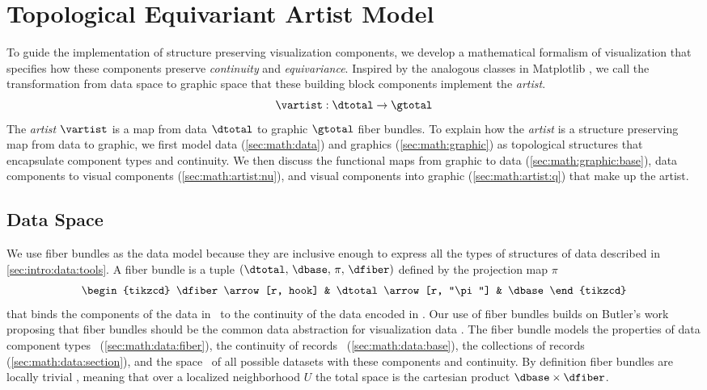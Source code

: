 \documentclass[../main.tex]{subfiles}
\begin{document}
\section{Topological Equivariant Artist Model}
\label{sec:math}
To guide the implementation of structure preserving visualization components, we develop a mathematical formalism of visualization that specifies how these components preserve \textit{continuity} and \textit{equivariance}. Inspired by the analogous classes in Matplotlib \cite{hunterArchitectureOpenSource}, we call the transformation from data space to graphic space that these building block components implement the \textit{artist}.
\begin{equation}
    \label{eq:artist}
    \mathscr{\vartist}: \mathscr{\dtotal} \rightarrow \mathscr{\gtotal}
\end{equation}
The \textit{artist} \(\mathscr{\vartist}\) is a map from data \(\mathscr{\dtotal}\) to graphic \(\mathscr{\gtotal}\) fiber bundles. To explain how the \textit{artist} is a structure preserving map from data to graphic, we first model data (\autoref{sec:math:data}) and graphics (\autoref{sec:math:graphic}) as topological structures that encapsulate component types and continuity. We then discuss the functional maps from graphic to data (\autoref{sec:math:graphic:base}), data components to visual components (\autoref{sec:math:artist:nu}), and visual components into graphic (\autoref{sec:math:artist:q}) that make up the artist.

\subsection{Data Space \dtotal}
\label{sec:math:data}
We use fiber bundles as the data model because they are inclusive enough to express all the types of structures of data described in \autoref{sec:intro:data:tools}. A fiber bundle is a tuple \((\dtotal,\,\dbase,\,\pi ,\,\dfiber)\) defined by the projection map \(\pi\)
\begin{equation}
    \label{eq:fiber_bundle}
    \begin{tikzcd}
        \dfiber \arrow[r, hook] & \dtotal \arrow[r, "\pi"] & \dbase
    \end{tikzcd}
\end{equation}
that binds the components of the data in \dfiber\ to the continuity of the data encoded in \dbase. Our use of fiber bundles builds on Butler's work proposing that fiber bundles should be the common data abstraction for visualization data \cite{butlerVectorBundleClassesForm1992, butlerVisualizationModelBased1989}. The fiber bundle models the properties of data component types \dfiber\ (\autoref{sec:math:data:fiber}), the continuity of records \dbase\ (\autoref{sec:math:data:base}), the collections of records (\autoref{sec:math:data:section}), and the space \dtotal\ of all possible datasets with these components and continuity. By definition fiber bundles are locally trivial \cite{spanier1989algebraic,LocallyTrivialFibre}, meaning that over a localized neighborhood \(U\) the total space is the cartesian product \(\dbase\times\dfiber\). 
\end{document}
